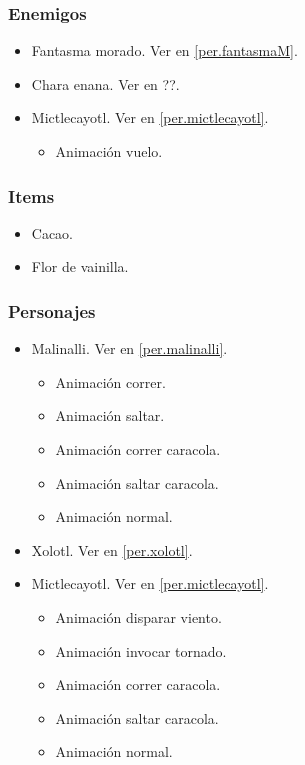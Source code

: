\documentclass[11pt,letterpaper]{article}
\begin{document}
\begin{itemize}
        \subsubsection{Enemigos}
\begin{itemize}
        \item Fantasma morado. Ver en \ref{per.fantasmaM}.
        \item Chara enana. Ver en ??.
		\item Mictlecayotl. Ver en \ref{per.mictlecayotl}.
\begin{itemize}
        \item   Animación vuelo.
\end{itemize}			
\end{itemize}
        \subsubsection{Items}
\begin{itemize}
        \item Cacao.
        \item Flor de vainilla.
\end{itemize}
        \subsubsection{Personajes}
        \begin{itemize}
                \item Malinalli. Ver en \ref{per.malinalli}.
                \begin{itemize}
                        \item Animación correr.
                        \item Animación saltar.
                        \item Animación correr caracola.
                        \item Animación saltar caracola.
                        \item Animación normal.
                \end{itemize} 
                \item Xolotl. Ver en \ref{per.xolotl}.
                \item Mictlecayotl. Ver en \ref{per.mictlecayotl}.
                \begin{itemize}
                        \item Animación disparar viento.
                        \item Animación invocar tornado.
                        \item Animación correr caracola.
                        \item Animación saltar caracola.
                        \item Animación normal.
                \end{itemize} 
        \end{itemize}

\end{itemize}
\end{document}
